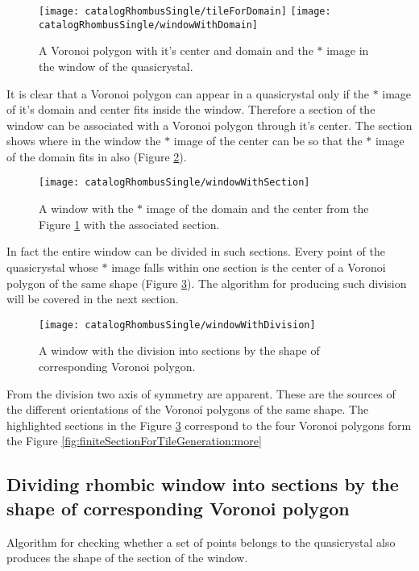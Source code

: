 \documentclass[text.tex]{subfiles}
\begin{document}
\begin{figure}[h]
\centering
\texttt{[image: catalogRhombusSingle/tileForDomain]}
\texttt{[image: catalogRhombusSingle/windowWithDomain]}
\caption{A Voronoi polygon with it's center and domain and the $\ast$ image in the window of the quasicrystal.}
\label{fig:windowWithDomain}
\end{figure}

It is clear that a Voronoi polygon can appear in a quasicrystal only if the $\ast$ image of it's domain and center fits inside the window. Therefore a section of the window can be associated with a Voronoi polygon through it's center. The section shows where in the window the $\ast$ image of the center can be so that the $\ast$ image of the domain fits in also (Figure \ref{fig:windowWithSection}). 

\begin{figure}[h]
\centering
\texttt{[image: catalogRhombusSingle/windowWithSection]}
\caption{A window with the $\ast$ image of the domain and the center from the Figure \ref{fig:windowWithDomain} with the associated section.}
\label{fig:windowWithSection}
\end{figure}

In fact the entire window can be divided in such sections. Every point of the quasicrystal whose $\ast$ image falls within one section is the center of a Voronoi polygon of the same shape (Figure \ref{fig:windowWithDivision}). The algorithm for producing such division will be covered in the next section.  

\begin{figure}[h]
\centering
\texttt{[image: catalogRhombusSingle/windowWithDivision]}
\caption{A window with the division into sections by the shape of corresponding Voronoi polygon.}
\label{fig:windowWithDivision}
\end{figure}

From the division two axis of symmetry are apparent. These are the sources of the different orientations of the Voronoi polygons of the same shape. The highlighted sections in the Figure \ref{fig:windowWithDivision} correspond to the four Voronoi polygons form the Figure \ref{fig:finiteSectionForTileGeneration:more}

\subsection{Dividing rhombic window into sections by the shape of corresponding Voronoi polygon}
Algorithm for checking whether a set of points belongs to the quasicrystal also produces the shape of the section of the window. 
\end{document}
